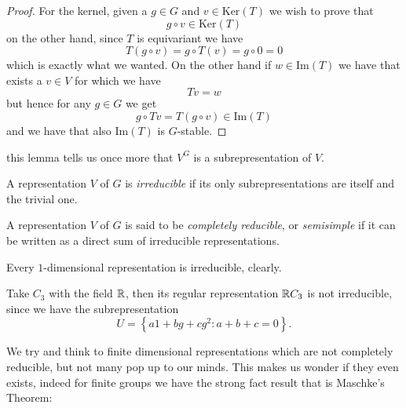 \documentclass[11pt]{scrartcl}
\newcommand{\Immagine}[1]{\text{Im}\left(#1\right)}
\renewcommand{\ker}[1]{\text{Ker}\left(#1\right)}
\begin{document}
	\begin{proof}
		For the kernel, given a $g\in G$ and $v\in \ker{T}$ we wish to prove that 
		$$g\circ v\in \ker{T}$$
		on the other hand, since $T$ is equivariant we have
		$$T(g\circ v)=g\circ T(v)=g\circ 0 = 0$$
		which is exactly what we wanted. On the other hand if $w\in \Immagine{T}$ we have that exists a $v\in V$ for which we have
		$$Tv=w$$
		but hence for any $g\in G$ we get
		$$g\circ Tv = T\left(g\circ v\right)\in \Immagine{T}$$
		and we have that also $\Immagine{T}$ is $G$-stable.
	\end{proof}
	this lemma tells us once more that $V^G$ is a subrepresentation of $V$.
	\begin{definition}
		A representation $V$ of $G$ is \textit{irreducible} if its only subrepresentations are itself and the trivial one.
	\end{definition}
	\begin{definition}
		A representation $V$ of $G$ is said to be \textit{completely reducible}, or \textit{semisimple} if it can be written as a direct sum of irreducible representations.
	\end{definition}
	\begin{example}
		Every $1$-dimensional representation is irreducible, clearly.
	\end{example}
	\begin{example}
		Take $C_3$ with the field $\mathbb R$, then its regular representation $\mathbb R C_3$ is not irreducible, since we have the subrepresentation
		$$U=\left\{a1+bg+cg^2:a+b+c=0\right\}.$$
	\end{example}
	We try and think to finite dimensional representations which are not completely reducible, but not many pop up to our minds. This makes us wonder if they even exists, indeed for finite groups we have the strong fact result that is Maschke's Theorem:
	
\end{document}
